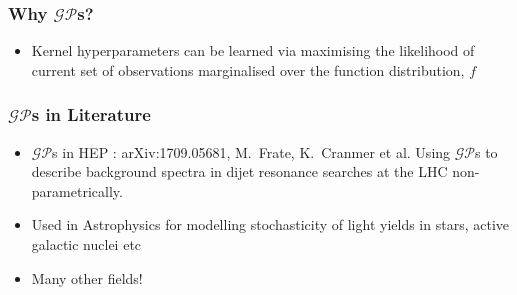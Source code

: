 \documentclass[9pt, aspectratio=169]{beamer}
\begin{document}
\begin{frame}
  \frametitle{Why $\mathcal{GP}$s?}
  \begin{itemize}
    \item Kernel hyperparameters can be learned via maximising the likelihood of current set of observations marginalised over the function distribution, $f$
  \end{itemize}
\end{frame}
  
\begin{frame}
        \frametitle{$\mathcal{GP}$s in Literature}
        \begin{itemize}
  \item $\mathcal{GP}$s in HEP : arXiv:1709.05681, M.~Frate, K.~Cranmer et al. Using $\mathcal{GP}$s to describe background spectra in dijet resonance searches at the LHC non-parametrically.
  \item Used in Astrophysics for modelling stochasticity of light yields in stars, active galactic nuclei etc
  \item Many other fields! 
  \end{itemize}
\end{frame}
\end{document}
